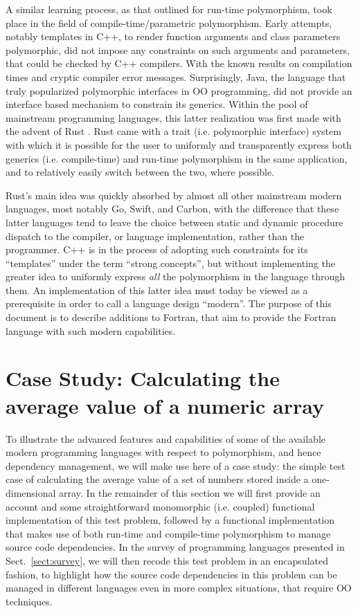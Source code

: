 \documentclass[11pt,oneside]{article}
\begin{document}
A similar learning process, as that outlined for run-time
polymorphism, took place in the field of compile-time/parametric
polymorphism. Early attempts, notably templates in C++, to render
function arguments and class parameters polymorphic, did not impose
any constraints on such arguments and parameters, that could be
checked by C++ compilers. With the known results on compilation times
and cryptic compiler error messages. Surprisingly, Java, the language
that truly popularized polymorphic interfaces in OO programming, did
not provide an interface based mechanism to constrain its
generics. Within the pool of mainstream programming languages, this
latter realization was first made with the advent of Rust
\cite{Matsakis_2014}. Rust came with a trait (i.e. polymorphic
interface) system with which it is possible for the user to uniformly
and transparently express both generics (i.e. compile-time) and
run-time polymorphism in the same application, and to relatively
easily switch between the two, where possible.

Rust's main idea was quickly absorbed by almost all other mainstream
modern languages, most notably Go, Swift, and Carbon, with the
difference that these latter languages tend to leave the choice
between static and dynamic procedure dispatch to the compiler, or
language implementation, rather than the programmer. C++ is in the
process of adopting such constraints for its ``templates'' under the
term ``strong concepts'', but without implementing the greater idea to
uniformly express \emph{all} the polymorphism in the language through
them. An implementation of this latter idea must today be viewed as a
prerequisite in order to call a language design ``modern''. The
purpose of this document is to describe additions to Fortran, that aim
to provide the Fortran language with such modern capabilities.

\newpage

\section{Case Study: Calculating the average value of a numeric array}

To illustrate the advanced features and capabilities of some of the
available modern programming languages with respect to polymorphism,
and hence dependency management, we will make use here of a case
study: the simple test case of calculating the average value of a set
of numbers stored inside a one-dimensional array. In the remainder of
this section we will first provide an account and some straightforward
monomorphic (i.e. coupled) functional implementation of this test
problem, followed by a functional implementation that makes use of
both run-time and compile-time polymorphism to manage source code
dependencies. In the survey of programming languages presented in
Sect.~\ref{sect:survey}, we will then recode this test problem in an
encapsulated fashion, to highlight how the source code dependencies in
this problem can be managed in different languages even in more
complex situations, that require OO techniques.
\end{document}

